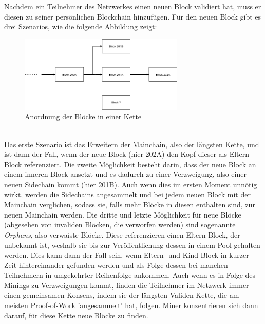 Nachdem ein Teilnehmer des Netzwerkes einen neuen Block validiert hat, muss er diesen zu seiner persönlichen Blockchain hinzufügen. Für den neuen Block gibt es drei Szenarios, wie die folgende Abbildung zeigt:
\begin{figure}[htpb]
	\centering
	\includegraphics[width=0.7\textwidth]{images/chains.png}
	\caption{Anordnung der Blöcke in einer Kette}
	\label{6braun:fig:chains}
\end{figure}\\
Das erste Szenario ist das Erweitern der Mainchain, also der längsten Kette, und ist dann der Fall, wenn der neue Block (hier 202A) den Kopf dieser als Eltern-Block referenziert.
Die zweite Möglichkeit besteht darin, dass der neue Block an einem inneren Block ansetzt und es dadurch zu einer Verzweigung, also einer neuen Sidechain kommt (hier 201B). Auch wenn dies im ersten Moment unnötig wirkt, werden die Sidechains angesammelt und bei jedem neuen Block mit der Mainchain verglichen, sodass sie, falls mehr Blöcke in diesen enthalten sind, zur neuen Mainchain werden.
Die dritte und letzte Möglichkeit für neue Blöcke (abgesehen von invaliden Blöcken, die verworfen werden) sind sogenannte \emph{Orphans}, also verwaiste Blöcke. Diese referenzieren einen Eltern-Block, der unbekannt ist, weshalb sie bis zur Veröffentlichung dessen in einem Pool gehalten werden. Dies kann dann der Fall sein, wenn Eltern- und Kind-Block in kurzer Zeit hintereinander gefunden werden und als Folge dessen bei manchen Teilnehmern in umgekehrter Reihenfolge ankommen. Auch wenn es in Folge des Minings zu Verzweigungen kommt, finden die Teilnehmer im Netzwerk immer einen gemeinsamen Konsens, indem sie der längsten Validen Kette, die am meisten Proof-of-Work 'angesammelt' hat, folgen. Miner konzentrieren sich dann darauf, für diese Kette neue Blöcke zu finden.\\

